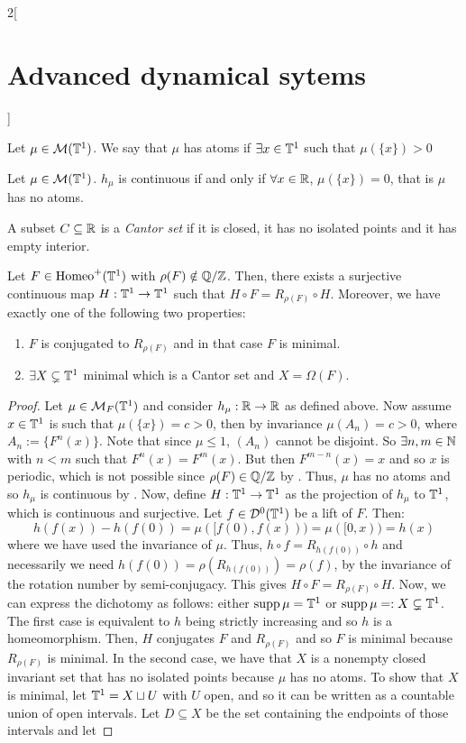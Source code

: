 \documentclass[../../../main_math.tex]{subfiles}
\begin{document}
\begin{multicols}{2}[\section{Advanced dynamical sytems}]
  \begin{lemma}
    Let $\mu\in\mathcal{M}(\mathbb{T}^1)$. We say that $\mu$ has atoms if $\exists x\in\mathbb{T}^1$ such that $\mu(\{x\})>0$
  \end{lemma}
  \begin{lemma}\label{ADS:lemma_atom}
    Let $\mu\in\mathcal{M}(\mathbb{T}^1)$. $h_\mu$ is continuous if and only if $\forall x\in\mathbb{R}$, $\mu(\{x\})=0$, that is $\mu$ has no atoms.
  \end{lemma}
  \begin{definition}
    A subset $C\subseteq \mathbb{R}$ is a \emph{Cantor set} if it is closed, it has no isolated points and it has empty interior.
  \end{definition}
  \begin{theorem}\label{ADS:theorem_irrational_rotation_number}
    Let $F\in\mathrm{Homeo}^+(\mathbb{T}^1)$ with $\rho(F)\notin\quot{\QQ}{\ZZ}$. Then, there exists a surjective continuous map $H:\mathbb{T}^1\to \mathbb{T}^1$ such that $H\circ F=R_{\rho(F)}\circ H$. Moreover, we have exactly one of the following two properties:
    \begin{enumerate}
      \item $F$ is conjugated to $R_{\rho(F)}$ and in that case $F$ is minimal.
      \item $\exists X\subsetneq \mathbb{T}^1$ minimal which is a Cantor set and $X=\Omega(F)$.
    \end{enumerate}
  \end{theorem}
  \begin{proof}
    Let $\mu\in\mathcal{M}_F(\mathbb{T}^1)$ and consider $h_\mu:\mathbb{R}\to\mathbb{R}$ as defined above. Now assume $x\in \mathbb{T}^1$ is such that $\mu(\{x\})=c>0$, then by invariance $\mu(A_n)=c>0$, where $A_n:=\{F^n(x)\}$. Note that since $\mu\leq 1$, $(A_n)$ cannot be disjoint. So $\exists n,m\in\mathbb{N}$ with $n<m$ such that $F^n(x)=F^m(x)$. But then $F^{m-n}(x)=x$ and so $x$ is periodic, which is not possible since $\rho(F)\in\quot{\QQ}{\ZZ}$ by . Thus, $\mu$ has no atoms and so $h_\mu$ is continuous by . Now, define $H:\mathbb{T}^1\to \mathbb{T}^1$ as the projection of $h_\mu$ to $\mathbb{T}^1$, which is continuous and surjective. Let $f\in\mathcal{D}^0(\mathbb{T}^1)$ be a lift of $F$. Then:
    $$
      h(f(x))-h(f(0))=\mu([f(0),f(x)))=\mu([0,x))=h(x)
    $$
    where we have used the invariance of $\mu$. Thus, $h\circ f=R_{h(f(0))}\circ h$ and necessarily we need $h(f(0))=\rho(R_{h(f(0))})=\rho(f)$, by the invariance of the rotation number by semi-conjugacy. This gives $H\circ F=R_{\rho(F)}\circ H$. Now, we can express the dichotomy as follows: either $\operatorname{supp}\mu=\mathbb{T}^1$ or $\operatorname{supp}\mu=:X\subsetneq \mathbb{T}^1$. The first case is equivalent to $h$ being strictly increasing and so $h$ is a homeomorphism. Then, $H$ conjugates $F$ and $R_{\rho(F)}$ and so $F$ is minimal because $R_{\rho(F)}$ is minimal. In the second case, we have that $X$ is a nonempty closed invariant set that has no isolated points because $\mu$ has no atoms. To show that $X$ is minimal, let $\mathbb{T}^1=X\sqcup U$ with $U$ open, and so it can be written as a countable union of open intervals. Let $D\subseteq X$ be the set containing the endpoints of those intervals and let

\end{proof}
\end{multicols}
\end{document}
